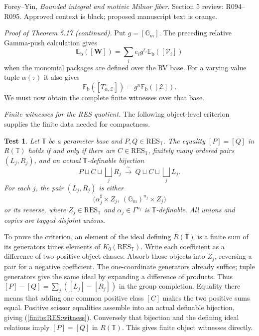 \documentclass[12pt]{amsart}
\theoremstyle{remark}
\theoremstyle{definition}
\newcommand{\RES}{\mathrm{RES}}
\numberwithin{equation}{section}
\newcommand{\Gm}{\mathbb G_m}
\theoremstyle{plain}
\theoremstyle{plain}
\newtheorem{test}[thm]{Test}
\begin{document}
\setcounter{section}{5}
\setcounter{subsection}{2}
\setcounter{thm}{19}
{\small\noindent Forey--Yin, \emph{Bounded integral and motivic Milnor fiber}.
Section 5 review: R094--R095.
Approved context is black; proposed manuscript text is orange.}
\medskip

\noindent\emph{Proof of Theorem 5.17 (continued).}
Put $g=[\Gm]$.
The preceding relative Gamma-push calculation gives
\[
 \mathbb E_{\mathrm b}([\bm W])
   =\sum_i e_i g^{\ell_i}\mathbb E_{\mathrm b}([\mathcal V_i])
\]
when the monomial packages are defined over the RV base.
For a varying value tuple $\alpha(\tau)$ it also gives
\[
 \mathbb E_{\mathrm b}([T_{\alpha,\mathcal Z}])
      =g^n\mathbb E_{\mathrm b}([\mathcal Z]).
\]
We must now obtain the complete finite witnesses over that base.

{\color{ProposalOrange}
\medskip
\noindent\emph{Finite witnesses for the RES quotient.}
The following object-level criterion supplies the finite
data needed for compactness.

\begin{test}\label{test}
Let $\mathbb T$ be a parameter base and
$P,Q\in\RES_{\mathbb T}$.
The equality $[P]=[Q]$ in $R(\mathbb T)$ holds if and only if
there are $C\in\RES_{\mathbb T}$, finitely many ordered pairs
$(L_j,R_j)$, and an actual $\mathbb T$-definable bijection
\begin{equation}\label{finite:RES:witness}
 P\sqcup C\sqcup\bigsqcup_j R_j
       \ \xrightarrow{\ \sim\ }\
 Q\sqcup C\sqcup\bigsqcup_j L_j .
\end{equation}
For each $j$, the pair $(L_j,R_j)$ is either
\[
 \bigl(\alpha_j^\sharp\times Z_j,\
              (\Gm)^{n_j}\times Z_j\bigr)
\]
or its reverse, where
$Z_j\in\RES_{\mathbb T}$ and
$\alpha_j\in\Gamma^{n_j}$ is $\mathbb T$-definable.
All unions and copies are tagged disjoint unions.
\end{test}

To prove the criterion, an element of the ideal defining
$R(\mathbb T)$ is a finite sum of its generators times
elements of $K_0(\RES_{\mathbb T})$.
Write each coefficient as a difference of two positive
object classes. Absorb those objects into $Z_j$, reversing
a pair for a negative coefficient.
The one-coordinate generators already suffice; tuple
generators give the same ideal by expanding a difference
of products.
Thus $[P]-[Q]=\sum_j([L_j]-[R_j])$ in the group completion.
Equality there means that adding one common positive class
$[C]$ makes the two positive sums equal.
Positive scissor equalities assemble into an actual
definable bijection, giving
(\ref{finite:RES:witness}).
Conversely that bijection and the defining ideal relations
imply $[P]=[Q]$ in $R(\mathbb T)$.
This gives finite object witnesses directly.

}
\end{document}
